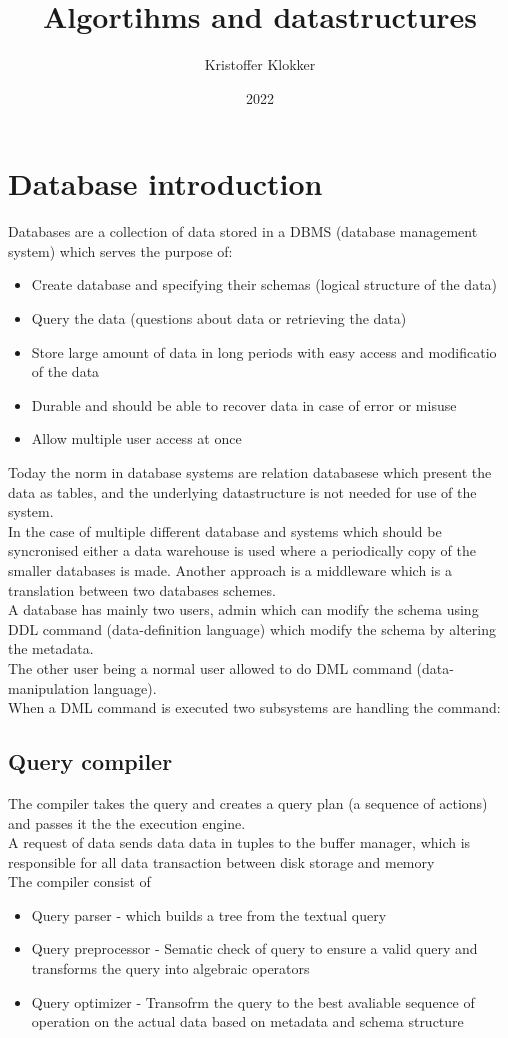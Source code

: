 \documentclass[12pt, a4paper]{article}
\title{Algortihms and datastructures}
\date{2022}
\author{Kristoffer Klokker}
\begin{document}
	\maketitle
	\clearpage
	\tableofcontents
	\clearpage
	\section{Database introduction}
		Databases are a collection of data stored in a DBMS (database management system) which serves the purpose of:
			\begin{itemize}
				\item Create database and specifying their schemas (logical structure of the data)
				\item Query the data (questions about data or retrieving the data)
				\item Store large amount of data in long periods with easy access and modificatio of the data
				\item Durable and should be able to recover data in case of error or misuse
				\item Allow multiple user access at once
			\end{itemize}
			Today the norm in database systems are relation databasese which present the data as tables, and the underlying datastructure is not needed for use of the system.\\
			In the case of multiple different database and systems which should be syncronised either a data warehouse is used where a periodically copy of the smaller databases is made. Another approach is a middleware which is a translation between two databases schemes.\\
			A database has mainly two users, admin which can modify the schema using DDL command (data-definition language) which modify the schema by altering the metadata.\\
			The other user being a normal user allowed to do DML command (data-manipulation language). \\
			When a DML command is executed two subsystems are handling the command:
				\subsection{Query compiler}
					The compiler takes the query and creates a query plan (a sequence of actions) and passes it the the execution engine.\\
					A request of data sends data data in tuples to the buffer manager, which is responsible for all data transaction between disk storage and memory\\
					The compiler consist of
					\begin{itemize}
						\item Query parser - which builds a tree from the textual query
						\item Query preprocessor - Sematic check of query to ensure a valid query and transforms the query into algebraic operators
						\item Query optimizer - Transofrm the query to the best avaliable sequence of operation on the actual data based on metadata and schema structure
					\end{itemize}
\end{document}

